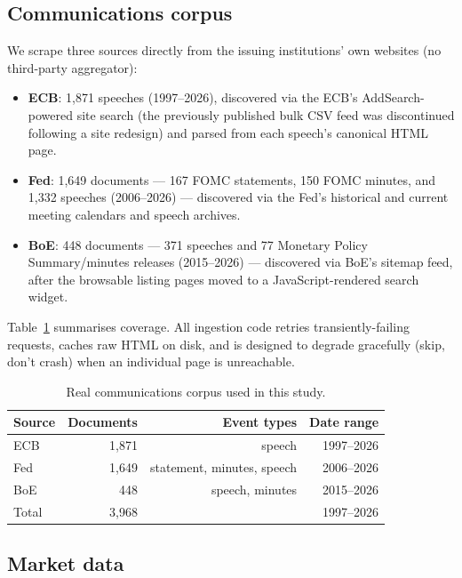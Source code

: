 \documentclass[11pt]{article}
\begin{document}
\subsection{Communications corpus}

We scrape three sources directly from the issuing institutions' own
websites (no third-party aggregator):

\begin{itemize}
  \item \textbf{ECB}: 1,871 speeches (1997--2026), discovered via the
    ECB's AddSearch-powered site search (the previously published bulk CSV
    feed was discontinued following a site redesign) and parsed from each
    speech's canonical HTML page.
  \item \textbf{Fed}: 1,649 documents --- 167 FOMC statements, 150 FOMC
    minutes, and 1,332 speeches (2006--2026) --- discovered via the Fed's
    historical and current meeting calendars and speech archives.
  \item \textbf{BoE}: 448 documents --- 371 speeches and 77 Monetary
    Policy Summary/minutes releases (2015--2026) --- discovered via BoE's
    sitemap feed, after the browsable listing pages moved to a
    JavaScript-rendered search widget.
\end{itemize}

\noindent Table~\ref{tab:corpus} summarises coverage. All ingestion code
retries transiently-failing requests, caches raw HTML on disk, and is
designed to degrade gracefully (skip, don't crash) when an individual page
is unreachable.

\begin{table}[H]
\centering
\begin{tabular}{lrrr}
\toprule
Source & Documents & Event types & Date range \\
\midrule
ECB & 1,871 & speech & 1997--2026 \\
Fed & 1,649 & statement, minutes, speech & 2006--2026 \\
BoE & 448 & speech, minutes & 2015--2026 \\
\midrule
Total & 3,968 & & 1997--2026 \\
\bottomrule
\end{tabular}
\caption{Real communications corpus used in this study.}
\label{tab:corpus}
\end{table}

\subsection{Market data}
\end{document}
